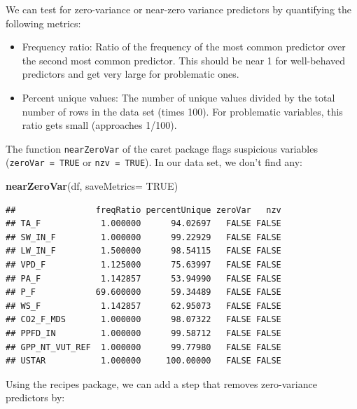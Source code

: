 \documentclass[
]{book}
\newenvironment{Shaded}{\begin{snugshade}}{\end{snugshade}}
\newcommand{\DataTypeTok}[1]{\textcolor[rgb]{0.13,0.29,0.53}{#1}}
\newcommand{\KeywordTok}[1]{\textcolor[rgb]{0.13,0.29,0.53}{\textbf{#1}}}
\newcommand{\NormalTok}[1]{#1}
\newcommand{\OperatorTok}[1]{\textcolor[rgb]{0.81,0.36,0.00}{\textbf{#1}}}
\newcommand{\OtherTok}[1]{\textcolor[rgb]{0.56,0.35,0.01}{#1}}
\newcommand{\StringTok}[1]{\textcolor[rgb]{0.31,0.60,0.02}{#1}}
\providecommand{\tightlist}{%
  \setlength{\itemsep}{0pt}\setlength{\parskip}{0pt}}
\begin{document}
We can test for zero-variance or near-zero variance predictors by quantifying the following metrics:

\begin{itemize}
\tightlist
\item
  Frequency ratio: Ratio of the frequency of the most common predictor over the second most common predictor. This should be near 1 for well-behaved predictors and get very large for problematic ones.
\item
  Percent unique values: The number of unique values divided by the total number of rows in the data set (times 100). For problematic variables, this ratio gets small (approaches 1/100).
\end{itemize}

The function \texttt{nearZeroVar} of the caret package flags suspicious variables (\texttt{zeroVar\ =\ TRUE} or \texttt{nzv\ =\ TRUE}). In our data set, we don't find any:

\begin{Shaded}
\begin{Highlighting}[]
\KeywordTok{nearZeroVar}\NormalTok{(df, }\DataTypeTok{saveMetrics=} \OtherTok{TRUE}\NormalTok{)}
\end{Highlighting}
\end{Shaded}

\begin{verbatim}
##                freqRatio percentUnique zeroVar   nzv
## TA_F            1.000000      94.02697   FALSE FALSE
## SW_IN_F         1.000000      99.22929   FALSE FALSE
## LW_IN_F         1.500000      98.54115   FALSE FALSE
## VPD_F           1.125000      75.63997   FALSE FALSE
## PA_F            1.142857      53.94990   FALSE FALSE
## P_F            69.600000      59.34489   FALSE FALSE
## WS_F            1.142857      62.95073   FALSE FALSE
## CO2_F_MDS       1.000000      98.07322   FALSE FALSE
## PPFD_IN         1.000000      99.58712   FALSE FALSE
## GPP_NT_VUT_REF  1.000000      99.77980   FALSE FALSE
## USTAR           1.000000     100.00000   FALSE FALSE
\end{verbatim}

Using the recipes package, we can add a step that removes zero-variance predictors by:

\begin{Shaded}
\end{Shaded}
\end{document}
